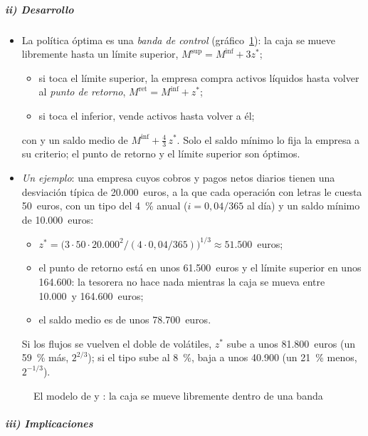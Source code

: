 \documentclass[11pt]{article}
\begin{document}
\subparagraph{ii) Desarrollo}

\begin{itemize}
\item La política óptima es una \emph{banda de control} (gráfico~\ref{fig:miller-orr}): la caja se mueve libremente hasta un límite superior, $M^{\mathrm{sup}}=M^{\mathrm{inf}}+3z^*$;
  \begin{itemize}
  \item si toca el límite superior, la empresa compra activos líquidos hasta volver al \emph{punto de retorno}, $M^{\mathrm{ret}}=M^{\mathrm{inf}}+z^*$;
  \item si toca el inferior, vende activos hasta volver a él;
  \end{itemize}
  con
  y un saldo medio de $M^{\mathrm{inf}}+\tfrac{4}{3}\,z^*$. Solo el saldo mínimo lo fija la empresa a su criterio; el punto de retorno y el límite superior son óptimos.
\item \emph{Un ejemplo}: una empresa cuyos cobros y pagos netos diarios tienen una desviación típica de 20.000~euros, a la que cada operación con letras le cuesta 50~euros, con un tipo del 4~\% anual ($i=0{,}04/365$ al día) y un saldo mínimo de 10.000~euros:
  \begin{itemize}
  \item $z^*=\big(3\cdot50\cdot20.000^2/(4\cdot0{,}04/365)\big)^{1/3}\approx51.500$~euros;
  \item el punto de retorno está en unos 61.500~euros y el límite superior en unos 164.600: la tesorera no hace nada mientras la caja se mueva entre 10.000~y 164.600~euros;
  \item el saldo medio es de unos 78.700~euros.
  \end{itemize}
  Si los flujos se vuelven el doble de volátiles, $z^*$ sube a unos 81.800~euros (un 59~\% más, $2^{2/3}$); si el tipo sube al 8~\%, baja a unos 40.900 (un 21~\% menos, $2^{-1/3}$).
\end{itemize}

\begin{figure}[H]
\centering
\caption{El modelo de  y : la caja se mueve libremente dentro de una banda}\label{fig:miller-orr}
\end{figure}

\subparagraph{iii) Implicaciones}
\end{document}

